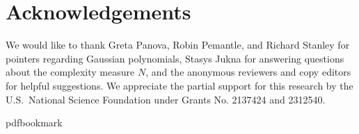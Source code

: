 \documentclass[11pt]{article}
\numberwithin{equation}{section}
\theoremstyle{definition}
\theoremstyle{plain}
\begin{document}
\section*{Acknowledgements}

We would like to thank Greta Panova, Robin Pemantle, and Richard Stanley for pointers regarding Gaussian polynomials, Stasys Jukna for answering questions about the complexity measure $N$, and the anonymous reviewers and copy editors for helpful suggestions. 
%
We appreciate the partial support for this research by the U.S.\ National Science Foundation under Grants No. 2137424 and 2312540. 
%
%

%

\newcommand{\prelim}{Preliminary version in\ }\newcommand{\prelims}{Preliminary
  versions in\ }
\providecommand{\bibhead}[1]{}
\expandafter\ifx\csname pdfbookmark\endcsname\relax%
  \providecommand{\tocrefpdfbookmark}{}
\else\providecommand{\tocrefpdfbookmark}{%
   \hypertarget{tocreferences}{}%
   \pdfbookmark[1]{References}{tocreferences}}%
\fi
\end{document}
